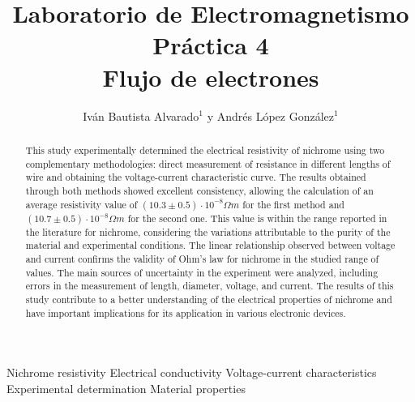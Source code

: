 \documentclass[article,12pt]{elsarticle}
\begin{document}
\begin{frontmatter}
    \title{Laboratorio de Electromagnetismo \\  Práctica  4\\ 
        Flujo de electrones}
    \author{Iván Bautista Alvarado$^1$ y Andrés López González$^1$} %
    \address{$^1$ Facultad de Ciencias, Universidad Nacional Autónoma de México, M\'exico CDMX.}


    \begin{abstract}
     This study experimentally determined the electrical resistivity of nichrome using two complementary methodologies: direct measurement of resistance in different lengths of wire and obtaining the voltage-current characteristic curve. The results obtained through both methods showed excellent consistency, allowing the calculation of an average resistivity value of $(10.3 \pm 0.5) \cdot 10^{-8} \Omega m$ for the first method and $(10.7 \pm 0.5) \cdot 10^{-8} \Omega m$ for the second one. This value is within the range reported in the literature for nichrome, considering the variations attributable to the purity of the material and experimental conditions. The linear relationship observed between voltage and current confirms the validity of Ohm's law for nichrome in the studied range of values. The main sources of uncertainty in the experiment were analyzed, including errors in the measurement of length, diameter, voltage, and current. The results of this study contribute to a better understanding of the electrical properties of nichrome and have important implications for its application in various electronic devices.
    \end{abstract}

    \begin{keyword}
     Nichrome resistivity
Electrical conductivity
Voltage-current characteristics
Experimental determination
Material properties
    \end{keyword}
\end{frontmatter}
\end{document}
